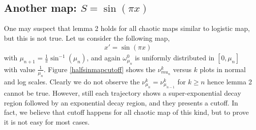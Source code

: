 \documentclass{article}
\begin{document}
  
\subsection{Another map: $S= \sin(\pi x)$}
One may suspect that lemma 2 holds for all chaotic maps similar to logistic map, but this is not true. Let us consider the following map,
 \begin{eqnarray}
    x' = \sin(\pi x)
 \end{eqnarray}
with $\mu_{n+1} = \frac{1}{\pi}\sin^{-1}(\mu_{n})$, and again $\omega_{\mu_n}^0$ is uniformly distributed in $[0, \mu_n]$ with value $\frac{1}{\mu_n}$. Figure \ref{halfsinmapcutoff} shows the $\nu_{mu_n}^k$ versus $k$ plots in normal and log scales. Clearly we do not observe the $\nu_{\mu_n}^k = \nu_{\mu_{n-1}}^{k}$ for $k \ge n$ hence lemma 2 cannot be true. However, still each trajectory shows a super-exponential decay region followed by an exponential decay region, and they presents a cutoff. In fact, we believe that cutoff happens for all chaotic map of this kind, but to prove it is not easy for most cases.  
\end{document}
